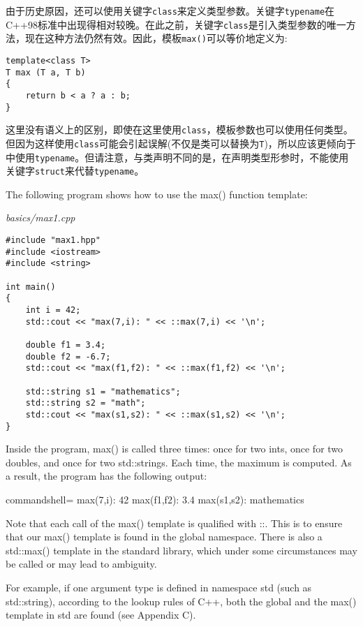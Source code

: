 由于历史原因，还可以使用关键字\texttt{class}来定义类型参数。关键字\texttt{typename}在C++98标准中出现得相对较晚。在此之前，关键字\texttt{class}是引入类型参数的唯一方法，现在这种方法仍然有效。因此，模板\texttt{max()}可以等价地定义为:

\begin{lstlisting}[style=styleCXX]
template<class T>
T max (T a, T b)
{
	return b < a ? a : b;
}
\end{lstlisting}

这里没有语义上的区别，即使在这里使用\texttt{class}，模板参数也可以使用任何类型。但因为这样使用\texttt{class}可能会引起误解(不仅是类可以替换为\texttt{T})，所以应该更倾向于中使用\texttt{typename}。但请注意，与类声明不同的是，在声明类型形参时，不能使用关键字\texttt{struct}来代替\texttt{typename}。


The following program shows how to use the max() function template:

\noindent
\textit{basics/max1.cpp}
\begin{lstlisting}[style=styleCXX]
#include "max1.hpp"
#include <iostream>
#include <string>

int main()
{
	int i = 42;
	std::cout << "max(7,i): " << ::max(7,i) << '\n';
	
	double f1 = 3.4;
	double f2 = -6.7;
	std::cout << "max(f1,f2): " << ::max(f1,f2) << '\n';
	
	std::string s1 = "mathematics";
	std::string s2 = "math";
	std::cout << "max(s1,s2): " << ::max(s1,s2) << '\n';
}
\end{lstlisting}

Inside the program, max() is called three times: once for two ints, once for two doubles, and once for two std::strings. Each time, the maximum is computed. As a result, the program has the following output:

\begin{tcblisting}{commandshell={}}
max(7,i): 42
max(f1,f2): 3.4
max(s1,s2): mathematics
\end{tcblisting}

Note that each call of the max() template is qualified with ::. This is to ensure that our max() template is found in the global namespace. There is also a std::max() template in the standard library, which under some circumstances may be called or may lead to ambiguity.

\begin{tcolorbox}[colback=webgreen!5!white,colframe=webgreen!75!black]
\hspace*{0.75cm}For example, if one argument type is defined in namespace std (such as std::string), according to the lookup rules of C++, both the global and the max() template in std are found (see Appendix C).
\end{tcolorbox}

